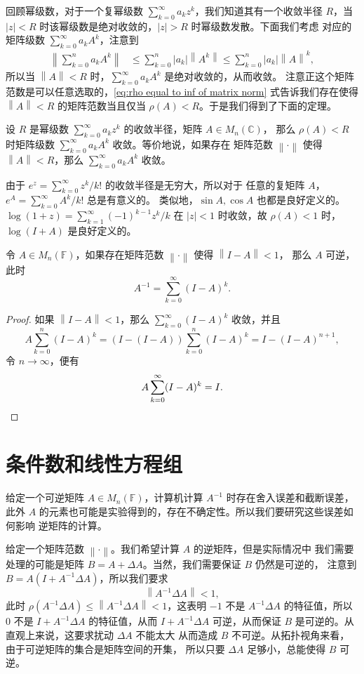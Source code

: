 \documentclass[fontset=none,zihao=-4]{Notes}
\newcommand{\norm}[1]{\left\lVert#1\right\rVert}
\begin{document}
回顾幂级数，对于一个复幂级数 $\sum_{k=0}^\infty a_kz^k$，我们知道其有一个收敛半径
$R$，当 $|z|<R$ 时该幂级数是绝对收敛的，$|z|>R$ 时幂级数发散。下面我们考虑
对应的矩阵级数 $\sum_{k=0}^\infty a_kA^k$，注意到
\begin{align*}
  \norm{\sum_{k=0}^n a_kA^k}&\leq\sum_{k=0}^n|a_k|\norm{A^k} \leq
  \sum_{k=0}^n|a_k|\norm{A}^k,
\end{align*}
所以当 $\norm{A}<R$ 时，$\sum_{k=0}^\infty a_kA^k$ 是绝对收敛的，从而收敛。
注意正这个矩阵范数是可以任意选取的，\eqref{eq:rho equal to inf of matrix norm}
式告诉我们存在使得 $\norm{A}<R$ 的矩阵范数当且仅当 $\rho(A)<R$。于是我们得到了下面的定理。

\begin{theorem}
  设 $R$ 是幂级数 $\sum_{k=0}^\infty a_k z^k$ 的收敛半径，矩阵 $A\in M_n(\mathbb{C})$，
  那么 $\rho(A)<R$ 时矩阵级数 $\sum_{k=0}^\infty a_kA^k$ 收敛。等价地说，如果存在
  矩阵范数 $\norm{\cdot}$ 使得 $\norm{A}<R$，那么 $\sum_{k=0}^\infty a_kA^k$ 收敛。
\end{theorem}

由于 $e^z=\sum_{k=0}^\infty z^k/k!$ 的收敛半径是无穷大，所以对于
任意的复矩阵 $A$，$e^A=\sum_{k=0}^\infty A^k/k!$ 总是有意义的。
类似地，$\sin A,\cos A$ 也都是良好定义的。$\log(1+z)=\sum_{k=1}^\infty(-1)^{k-1} z^k/k$
在 $|z|<1$ 时收敛，故 $\rho(A)<1$ 时，$\log(I+A)$ 是良好定义的。

\begin{corollary}
  令 $A\in M_n(\mathbb{F})$，如果存在矩阵范数 $\norm{\cdot}$ 使得 $\norm{I-A}<1$，
  那么 $A$ 可逆，此时
  \[
    A^{-1}=\sum_{k=0}^\infty (I-A)^k.  
  \]
\end{corollary}
\begin{proof}
  如果 $\norm{I-A}<1$，那么 $\sum_{k=0}^\infty (I-A)^k$ 收敛，并且
  \[
    A\sum_{k=0}^n(I-A)^k=(I-(I-A))\sum_{k=0}^n(I-A)^k=
    I-(I-A)^{n+1},  
  \]
  令 $n\to\infty$，便有
  \[
    A  \sum_{k=0}^\infty (I-A)^k=I.\qedhere 
  \]
\end{proof}

\section{条件数和线性方程组}

给定一个可逆矩阵 $A\in M_n(\mathbb{F})$，计算机计算 $A^{-1}$ 时存在舍入误差和截断误差，
此外 $A$ 的元素也可能是实验得到的，存在不确定性。所以我们要研究这些误差如何影响
逆矩阵的计算。

给定一个矩阵范数 $\norm{\cdot}$。我们希望计算 $A$ 的逆矩阵，但是实际情况中
我们需要处理的可能是矩阵 $B=A+\Delta A$。当然，我们需要保证 $B$ 仍然是可逆的，
注意到 $B=A(I+A^{-1}\Delta A)$，所以我们要求
\begin{equation}\label{eq:condition}
  \norm{A^{-1}\Delta A}<1,  
\end{equation}
此时 $\rho(A^{-1}\Delta A)\leq\norm{A^{-1}\Delta A}<1$，这表明 $-1$ 不是 $A^{-1}\Delta A$
的特征值，所以 $0$ 不是 $I+A^{-1}\Delta A$ 的特征值，从而 $I+A^{-1}\Delta A$
可逆，从而保证 $B$ 是可逆的。从直观上来说，这要求扰动 $\Delta A$ 不能太大
从而造成 $B$ 不可逆。从拓扑视角来看，由于可逆矩阵的集合是矩阵空间的开集，
所以只要 $\Delta A$ 足够小，总能使得 $B$ 可逆。
\end{document}
